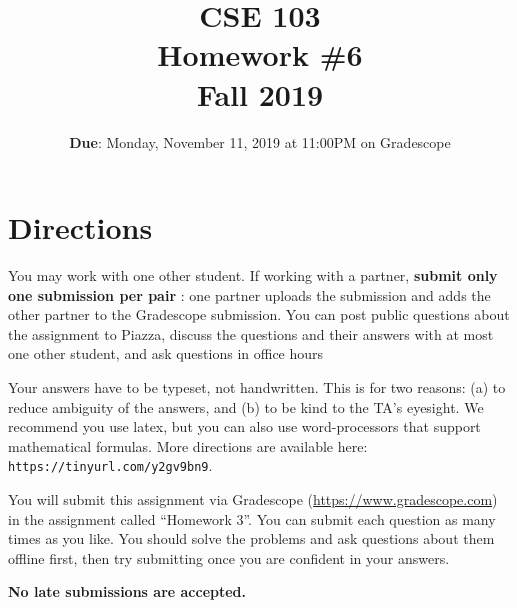 \documentclass[12pt, oneside]{article}
\title{\bf CSE 103 \\[2ex]
       \Large Homework \#6\\ Fall 2019}
\begin{document}
\date{\textbf{Due}: Monday, November 11, 2019 at 11:00PM on Gradescope}
\maketitle

\section{Directions}
You may work with one other student. If working with a partner,
\textbf{submit only one submission per pair} : one partner uploads the submission and adds the other partner to the Gradescope submission. You can post public questions about the assignment to Piazza, discuss the questions and their answers with at most one other student, and ask questions in office hours

Your answers have to be typeset, not handwritten. This is for two
reasons: (a) to reduce ambiguity of the answers, and (b) to be kind to
the TA's eyesight. We recommend you use latex, but you can also use
word-processors that support mathematical formulas. More directions
are available here: {\tt https://tinyurl.com/y2gv9bn9}.

You will submit this assignment via Gradescope
(\url{https://www.gradescope.com}) in the assignment called ``Homework
3''. You can submit each question as many times as you like. You should solve the problems and ask questions about them offline first, then try submitting once you are confident in your answers. 

\textbf{No late submissions are accepted.}


  \newpage
\end{document}
